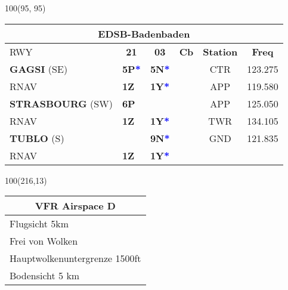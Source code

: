 \documentclass[10pt,landscape,a4paper]{article}
\begin{document}
\begin{textblock}{100}(95, 95)
\begin{table}[]
\begin{tabular}{|llllll}
\multicolumn{6}{c}{\textbf{EDSB-Badenbaden}} \\ \hline
\multicolumn{1}{|l|}{RWY} 									& \multicolumn{1}{c|}{\textbf{21}} 			& \multicolumn{1}{c|}{\textbf{03}}  				& \multicolumn{1}{c|}{\textbf{Cb}} 						& \multicolumn{1}{c|}{\textbf{Station}} 	& \multicolumn{1}{c|}{\textbf{Freq}}	\\ \hline
\multicolumn{1}{|l|}{\textbf{GAGSI} (SE)}							& \multicolumn{1}{l|}{\textbf{5P\textcolor{blue}{*}}}& \multicolumn{1}{l|}{\textbf{5N\textcolor{blue}{*}}} 	& \multicolumn{1}{c|}{\multirow{6}{*}{\rotatebox{90}{FL70}}}		& \multicolumn{1}{c|}{CTR}			& \multicolumn{1}{c|}{123.275}	\\ \cline{1-3}
\multicolumn{1}{|l|}{RNAV}									& \multicolumn{1}{l|}{\textbf{1Z} }			& \multicolumn{1}{l|}{\textbf{1Y\textcolor{blue}{*}}}	& \multicolumn{1}{c|}{}  								& \multicolumn{1}{c|}{APP}			& \multicolumn{1}{c|}{119.580}	\\ \cline{1-3}

\multicolumn{1}{|l|}{\textbf{STRASBOURG} (SW)} 						& \multicolumn{1}{l|}{\textbf{6P}} 			& \multicolumn{1}{l|}{\textbf{}}					& \multicolumn{1}{c|}{} 								& \multicolumn{1}{c|}{APP} 			& \multicolumn{1}{c|}{125.050}	\\ \cline{1-3}
\multicolumn{1}{|l|}{RNAV}									& \multicolumn{1}{l|}{\textbf{1Z}}			& \multicolumn{1}{l|}{\textbf{1Y\textcolor{blue}{*}}}		& \multicolumn{1}{c|}{} 							& \multicolumn{1}{c|}{TWR}			& \multicolumn{1}{c|}{134.105}		\\ \cline{1-3} 

\multicolumn{1}{|l|}{\textbf{TUBLO} (S)} 							& \multicolumn{1}{l|}{}					& \multicolumn{1}{l|}{\textbf{9N\textcolor{blue}{*}}}	& \multicolumn{1}{c|}{}								& \multicolumn{1}{c|}{GND}			& \multicolumn{1}{c|}{121.835} 	\\\cline{1-3} \cline{5-6}
\multicolumn{1}{|l|}{RNAV} 									& \multicolumn{1}{l|}{\textbf{1Z}} 			& \multicolumn{1}{l|}{\textbf{1Y\textcolor{blue}{*}}}	& \multicolumn{1}{c|}{}  								& \multicolumn{2}{c|}{}	\\ \hline
\end{tabular}
\end{table}
\end{textblock}


\begin{textblock}{100}(216,13)
\begin{table}[]
\begin{tabular}{|l|}
\multicolumn{1}{c}{\textbf{VFR Airspace D}} \\ \hline
 Flugsicht 5km   \\ \hline
Frei von Wolken   \\ \hline
Hauptwolkenuntergrenze 1500ft \\ \hline
Bodensicht 5 km \\ \hline
\end{tabular}
\end{table}
\end{textblock}
\end{document}
